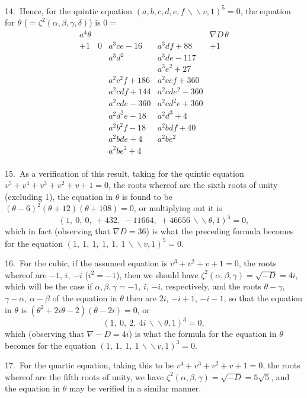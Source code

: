 \documentclass[11pt,a4paper]{article}
\theoremstyle{plain}
\theoremstyle{definition}
\theoremstyle{remark}
\begin{document}
14.\ Hence, for the quintic equation $(a,b,c,d,e,f\,\backslash\!\!\backslash v,1)^5=0$, the equation for $\theta$ ($=\zeta^2(\alpha,\beta,\gamma,\delta)$) is $0=$
\[
\begin{array}{ccccc}
a^4\theta & & & & \nabla D\,\theta\\
+1 & 0 & a^3ce-16 & a^3df+88 & +1\\
& & a^3d^2 & a^3de-117 & \\
& & & a^3e^2+27 & \\
& & a^2c^2f+186 & a^2cef+360 & \\
& & a^2cdf+144 & a^2cde^2-360 & \\
& & a^2cde-360 & a^2cd^2e+360 & \\
& & a^2d^2e-18 & a^2d^3+4 & \\
& & a^2b^2f-18 & a^2bdf+40 & \\
& & a^2bde+4 & a^2be^2 & \\
& & a^2be^2+4 & & \\
\end{array}
\]

\newpage
\setcounter{page}{305}

15.\ As a verification of this result, taking for the quintic equation $v^5+v^4+v^3+v^2+v+1=0$, the roots whereof are the sixth roots of unity (excluding 1), the equation in $\theta$ is found to be $(\theta-6)^2(\theta+12)(\theta+108)=0$, or multiplying out it is
\[
(1,\ 0,\ 0,\ +432,\ -11664,\ +46656\,\backslash\!\!\backslash\theta, 1)^5 = 0,
\]
which in fact (observing that $\nabla D=36$) is what the preceding formula becomes for the equation $(1,\ 1,\ 1,\ 1,\ 1,\ 1\,\backslash\!\!\backslash v, 1)^5=0$.

16.\ For the cubic, if the assumed equation is $v^3+v^2+v+1=0$, the roots whereof are $-1$, $i$, $-i$ ($i^2=-1$), then we should have $\zeta^2(\alpha,\beta,\gamma)=\sqrt{-D}=4i$, which will be the case if $\alpha,\beta,\gamma=-1$, $i$, $-i$, respectively, and the roots $\theta-\gamma$, $\gamma-\alpha$, $\alpha-\beta$ of the equation in $\theta$ then are $2i$, $-i+1$, $-i-1$, so that the equation in $\theta$ is $(\theta^2+2i\theta-2)(\theta-2i)=0$, or
\[
(1,\ 0,\ 2,\ 4i\,\backslash\!\!\backslash\theta,1)^3=0,
\]
which (observing that $\nabla-D=4i$) is what the formula for the equation in $\theta$ becomes for the equation $(1,\ 1,\ 1,\ 1\,\backslash\!\!\backslash v, 1)^3=0$.

17.\ For the quartic equation, taking this to be $v^4+v^3+v^2+v+1=0$, the roots whereof are the fifth roots of unity, we have $\zeta^2(\alpha,\beta,\gamma)=\sqrt{-D}=5\sqrt{5}$, and the equation in $\theta$ may be verified in a similar manner.
\end{document}
